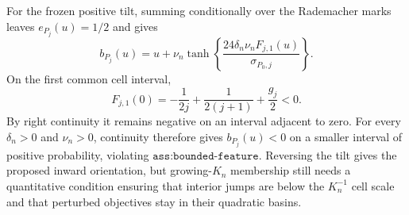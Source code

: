 For the frozen positive tilt, summing conditionally over the Rademacher marks leaves \(e_{P_j}(u)=1/2\) and gives
\[
 b_{P_j}(u)=u+\nu_n\tanh\left\{\frac{24\delta_n\nu_nF_{j,1}(u)}{\sigma_{P_0,j}}\right\}.
\]
On the first common cell interval,
\[
 F_{j,1}(0)=-\frac1{2j}+\frac1{2(j+1)}+\frac{g_j}{2}<0.
\]
By right continuity it remains negative on an interval adjacent to zero.  For every \(\delta_n>0\) and \(\nu_n>0\), continuity therefore gives \(b_{P_j}(u)<0\) on a smaller interval of positive probability, violating \(\texttt{ass:bounded-feature}\).  Reversing the tilt gives the proposed inward orientation, but growing-\(K_n\) membership still needs a quantitative condition ensuring that interior jumps are below the \(K_n^{-1}\) cell scale and that perturbed objectives stay in their quadratic basins.
